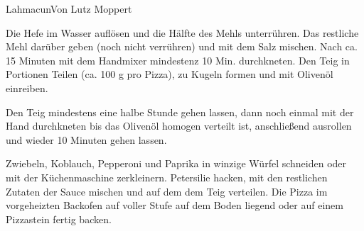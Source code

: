 \begin{recipe}{Lahmacun}{Von Lutz Moppert}
  \label{Lahmacun}


  \steps

  Die Hefe im Wasser auflösen und die Hälfte des Mehls unterrühren. Das
  restliche Mehl darüber geben (noch nicht verrühren) und mit dem Salz mischen.
  Nach ca.  15 Minuten mit dem Handmixer mindestenz 10 Min. durchkneten. Den
  Teig in Portionen Teilen (ca. 100 g pro Pizza), zu Kugeln formen und mit
  Olivenöl einreiben.

  Den Teig mindestens eine halbe Stunde gehen lassen, dann noch einmal mit der
  Hand durchkneten bis das Olivenöl homogen verteilt ist, anschließend
  ausrollen und wieder 10 Minuten gehen lassen.

  Zwiebeln, Koblauch, Pepperoni und Paprika in winzige Würfel schneiden oder
  mit der Küchenmaschine zerkleinern. Petersilie hacken, mit den restlichen
  Zutaten der Sauce mischen und auf dem dem Teig verteilen. Die Pizza im
  vorgeheizten Backofen auf voller Stufe auf dem Boden liegend oder auf einem
  Pizzastein fertig backen.

\end{recipe}
